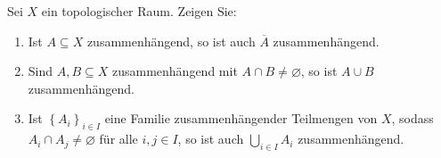 \begin{assignment}
  Sei \( X \) ein topologischer Raum. Zeigen Sie:
  \begin{enumerate}[label= (\alph*)]
    \item Ist \( A \subseteq X \) zusammenhängend, so ist auch \( \overline{A} \) zusammenhängend.
    \item Sind \( A,B \subseteq X \) zusammenhängend mit \( A \cap B \neq \varnothing \), so ist \( A \cup B \) zusammenhängend.
    \item Ist \( {\left \{ A_i \right \}}_{i \in I} \) eine Familie zusammenhängender Teilmengen von \( X \), sodass \( A_i \cap A_j \neq \varnothing \) für alle \( i, j \in I \), so ist auch \( \bigcup_{i \in I} A_i \) zusammenhängend.
  \end{enumerate}
\end{assignment}
